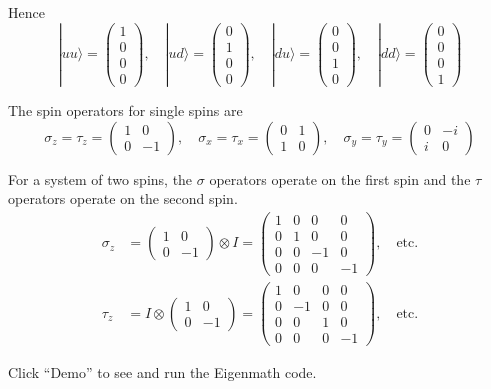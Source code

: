 \documentclass[12pt]{article}
\begin{document}
Hence
\begin{equation*}
|uu\rangle=\begin{pmatrix}1\\0\\0\\0\end{pmatrix},
\quad
|ud\rangle=\begin{pmatrix}0\\1\\0\\0\end{pmatrix},
\quad
|du\rangle=\begin{pmatrix}0\\0\\1\\0\end{pmatrix},
\quad
|dd\rangle=\begin{pmatrix}0\\0\\0\\1\end{pmatrix}
\end{equation*}

The spin operators for single spins are
\begin{equation*}
\sigma_z=\tau_z=\begin{pmatrix}1&0\\0&-1\end{pmatrix},
\quad
\sigma_x=\tau_x=\begin{pmatrix}0&1\\1&0\end{pmatrix},
\quad
\sigma_y=\tau_y=\begin{pmatrix}0&-i\\i&0\end{pmatrix}
\end{equation*}

For a system of two spins, the $\sigma$ operators operate on the first spin
and the $\tau$ operators operate on the second spin.
\begin{align*}
\sigma_z&=\begin{pmatrix}1&0\\0&-1\end{pmatrix}\otimes I
=\begin{pmatrix}1&0&0&0\\0&1&0&0\\0&0&-1&0\\0&0&0&-1\end{pmatrix},\quad\text{etc.}
\\[1ex]
\tau_z&=I\otimes\begin{pmatrix}1&0\\0&-1\end{pmatrix}
=\begin{pmatrix}1&0&0&0\\0&-1&0&0\\0&0&1&0\\0&0&0&-1\end{pmatrix},\quad\text{etc.}
\end{align*}

Click ``Demo'' to see and run the Eigenmath code.
\end{document}
